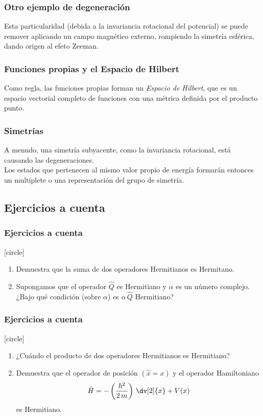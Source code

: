 \begin{frame}
\frametitle{Otro ejemplo de degeneración}
Esta particularidad (debida a la invariancia rotacional del potencial) se puede remover aplicando un campo magnético externo, rompiendo la simetría esférica, dando origen al efeto Zeeman.
\end{frame}
\begin{frame}
\frametitle{Funciones propias y el Espacio de Hilbert}
Como regla, las funciones propias forman un \emph{Espacio de Hilbert}, que es un espacio vectorial completo de funciones con una métrica definida por el producto punto.
\end{frame}
\begin{frame}
\frametitle{Simetrías}
A menudo, una simetría subyacente, como la invariancia rotacional, está causando las degeneraciones.
\\
\bigskip
Los estados que pertenecen al mismo valor propio de energía formarán entonces un multiplete o una representación del grupo de simetría.
\end{frame}
\subsection{Ejercicios a cuenta}
\begin{frame}
\frametitle{Ejercicios a cuenta}
[circle]
\begin{enumerate}[<+->]
\item Demuestra que la suma de dos operadores Hermitianos es Hermitano.
\item Supongamos que el operador $\hat{Q}$ es Hermitiano y $\alpha$ es un número complejo. ¿Bajo qué condición (sobre $\alpha$) es $\alpha \, \hat{Q}$ Hermitiano?
\seti
\end{enumerate}
\end{frame}
\begin{frame}
\frametitle{Ejercicios a cuenta}
[circle]
\begin{enumerate}[<+->]
\conti    
\item ¿Cuándo el producto de dos operadores Hermitianos es Hermitiano?
\item Demuestra que el operador de posición $(\hat{x} = x)$ y el operador Hamiltoniano
\begin{align*}
\hat{H} = - \left( \dfrac{\hbar^{2}}{2 \, m} \right) \, \dv[2]{x} + V(x)
\end{align*}
es Hermitiano.
\end{enumerate}
\end{frame}
